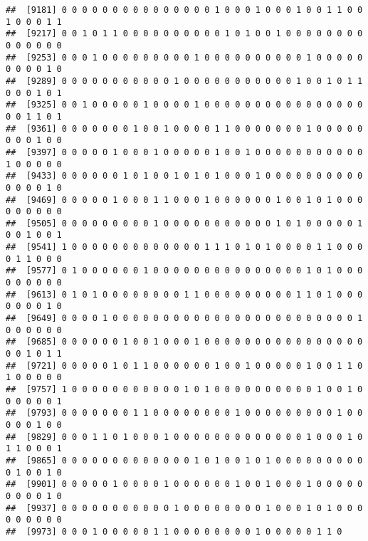 \documentclass[
]{article}
\newenvironment{Shaded}{\begin{snugshade}}{\end{snugshade}}
\newcommand{\CommentTok}[1]{\textcolor[rgb]{0.56,0.35,0.01}{\textit{#1}}}
\begin{document}
\begin{verbatim}
##  [9181] 0 0 0 0 0 0 0 0 0 0 0 0 0 0 0 1 0 0 0 1 0 0 0 1 0 0 1 1 0 0 1 0 0 0 1 1
##  [9217] 0 0 1 0 1 1 0 0 0 0 0 0 0 0 0 0 1 0 1 0 0 1 0 0 0 0 0 0 0 0 0 0 0 0 0 0
##  [9253] 0 0 0 1 0 0 0 0 0 0 0 0 0 1 0 0 0 0 0 0 0 0 0 0 1 0 0 0 0 0 0 0 0 0 1 0
##  [9289] 0 0 0 0 0 0 0 0 0 0 0 1 0 0 0 0 0 0 0 0 0 0 0 1 0 0 1 0 1 1 0 0 0 1 0 1
##  [9325] 0 0 1 0 0 0 0 0 1 0 0 0 0 1 0 0 0 0 0 0 0 0 0 0 0 0 0 0 0 0 0 0 1 1 0 1
##  [9361] 0 0 0 0 0 0 0 1 0 0 1 0 0 0 0 1 1 0 0 0 0 0 0 0 1 0 0 0 0 0 0 0 0 1 0 0
##  [9397] 0 0 0 0 0 1 0 0 0 1 0 0 0 0 0 1 0 0 1 0 0 0 0 0 0 0 0 0 0 0 1 0 0 0 0 0
##  [9433] 0 0 0 0 0 0 1 0 1 0 0 1 0 1 0 1 0 0 0 1 0 0 0 0 0 0 0 0 0 0 0 0 0 0 1 0
##  [9469] 0 0 0 0 0 1 0 0 0 1 1 0 0 0 1 0 0 0 0 0 0 1 0 0 1 0 1 0 0 0 0 0 0 0 0 0
##  [9505] 0 0 0 0 0 0 0 0 0 1 0 0 0 0 0 0 0 0 0 0 0 1 0 1 0 0 0 0 0 1 0 0 1 0 0 1
##  [9541] 1 0 0 0 0 0 0 0 0 0 0 0 0 0 1 1 1 0 1 0 1 0 0 0 0 1 1 0 0 0 0 1 1 0 0 0
##  [9577] 0 1 0 0 0 0 0 0 1 0 0 0 0 0 0 0 0 0 0 0 0 0 0 0 1 0 1 0 0 0 0 0 0 0 0 0
##  [9613] 0 1 0 1 0 0 0 0 0 0 0 0 1 1 0 0 0 0 0 0 0 0 0 1 1 0 1 0 0 0 0 0 0 0 1 0
##  [9649] 0 0 0 0 1 0 0 0 0 0 0 0 0 0 0 0 0 0 0 0 0 0 0 0 0 0 0 0 0 1 0 0 0 0 0 0
##  [9685] 0 0 0 0 0 0 1 0 0 1 0 0 0 1 0 0 0 0 0 0 0 0 0 0 0 0 0 0 0 0 0 0 1 0 1 1
##  [9721] 0 0 0 0 0 1 0 1 1 0 0 0 0 0 0 1 0 0 1 0 0 0 0 0 1 0 0 1 1 0 1 0 0 0 0 0
##  [9757] 1 0 0 0 0 0 0 0 0 0 0 0 1 0 1 0 0 0 0 0 0 0 0 0 0 1 0 0 1 0 0 0 0 0 0 1
##  [9793] 0 0 0 0 0 0 0 1 1 0 0 0 0 0 0 0 0 1 0 0 0 0 0 0 0 0 0 1 0 0 0 0 0 1 0 0
##  [9829] 0 0 0 1 1 0 1 0 0 0 1 0 0 0 0 0 0 0 0 0 0 0 0 0 1 0 0 0 1 0 1 1 0 0 0 1
##  [9865] 0 0 0 0 0 0 0 0 0 0 0 0 0 1 0 1 0 0 1 0 1 0 0 0 0 0 0 0 0 0 0 1 0 0 1 0
##  [9901] 0 0 0 0 0 1 0 0 0 0 1 0 0 0 0 0 0 1 0 0 1 0 0 0 1 0 0 0 0 0 0 0 0 0 1 0
##  [9937] 0 0 0 0 0 0 0 0 0 0 0 1 0 0 0 0 0 0 0 0 1 0 0 0 1 0 1 0 0 0 0 0 0 0 0 0
##  [9973] 0 0 0 1 0 0 0 0 0 1 1 0 0 0 0 0 0 0 0 1 0 0 0 0 0 1 1 0
\end{verbatim}

\begin{Shaded}
\end{Shaded}
\end{document}
